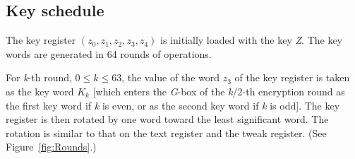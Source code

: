 \documentclass[a4paper,oneside,english]{amsart}
\numberwithin{equation}{section}
\numberwithin{figure}{section}
\begin{document}
\subsection{Key schedule}

The key register $(z_{0},z_{1},z_{2},z_{3},z_{4})$ is initially loaded
with the key \emph{Z}. The key words are generated in 64 rounds of
operations. 

For \emph{k}-th round, $0\leq k\leq63$, the value of the word $z_{3}$
of the key register is taken as the key word $K_{k}$ {[}which enters
the \emph{G}-box of the \emph{k}/2-th encryption round as the first
key word if \emph{k} is even, or as the second key word if \emph{k}
is odd{]}. The key register is then rotated by one word toward the
least significant word. The rotation is similar to that on the text
register and the tweak register. (See Figure~\ref{fig:Rounds}.)
\end{document}
